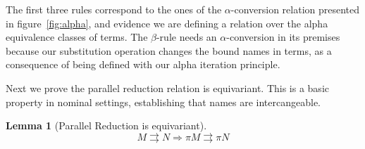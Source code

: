 \documentclass[preprint,10pt]{sigplanconf}
\newcommand{\alp}{\ensuremath{\alpha}}
\newcommand{\p}{\ensuremath{\rightrightarrows}}
\newtheorem{lemma}{Lemma}
\begin{document}
The first three rules correspond to the ones of the \alp-conversion relation presented in figure~\ref{fig:alpha}, and evidence we are defining a relation over the alpha equivalence classes of terms. 
The $\beta$-rule needs an \alp-conversion in its premises because our substitution operation changes the bound names in terms,  as a consequence of being defined with our alpha iteration principle. 

Next we prove the parallel reduction relation is equivariant. This is a basic property in nominal settings, establishing that names are intercangeable.

\begin{lemma}[Parallel Reduction is equivariant]
\label{pequiv}
\[ M \p N \Rightarrow \pi M \p \pi N \]
\end{lemma}
\end{document}
